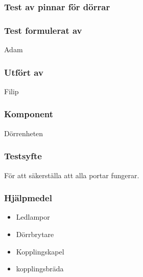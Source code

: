 \subsubsection{Test av pinnar för dörrar}
\label{test:portTest}

\setlength{\columnsep}{1cm}




\begin{multicols}{2}
\subsubsection*{Test formulerat av}
Adam

\subsubsection*{Utfört av}
Filip


\end{multicols}
\subsubsection*{Komponent}
Dörrenheten


\subsubsection*{Testsyfte}
För att säkerställa att alla portar fungerar.


\subsubsection*{Hjälpmedel}
\begin{itemize}
	\item Ledlampor
	\item Dörrbrytare
	\item Kopplingskapel
	\item kopplingsbräda
\end{itemize}



